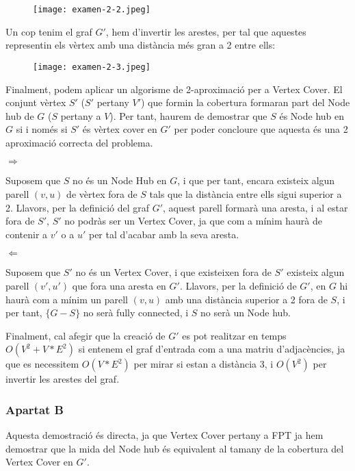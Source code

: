 \begin{figure}[H]
    \centering
    \texttt{[image: examen-2-2.jpeg]}
    \label{fig:ex2-2}
\end{figure}

Un cop tenim el graf $G'$, hem d'invertir les arestes, per tal que aquestes representin els vèrtex amb una distància més gran a 2 entre ells:

\begin{figure}[H]
    \centering
    \texttt{[image: examen-2-3.jpeg]}
    \label{fig:ex2-3}
\end{figure}

Finalment, podem aplicar un algorisme de 2-aproximació per a Vertex Cover. El conjunt vèrtex $S'$ ($S'$ pertany $V'$) que formin la cobertura formaran part del Node hub de $G$ ($S$ pertany a $V$). Per tant, haurem de demostrar que $S$ és Node hub en $G$ si i només si $S'$ és vèrtex cover en $G'$ per poder concloure que aquesta és una 2 aproximació correcta del problema.


$\Rightarrow$


Suposem que $S$ no és un Node Hub en $G$, i que per tant, encara existeix algun parell $(v,u)$ de vèrtex fora de $S$ tals que la distància entre ells sigui superior a 2. Llavors, per la definició del graf $G'$, aquest parell formarà una aresta, i al estar fora de $S'$, $S'$ no podràs ser un Vertex Cover, ja que com a mínim haurà de contenir a $v'$ o a $u'$ per tal d'acabar amb la seva aresta.


$\Leftarrow$


Suposem que $S'$ no és un Vertex Cover, i que existeixen fora de $S'$ existeix algun parell $(v',u')$ que fora una aresta en $G'$. Llavors, per la definició de $G'$, en $G$ hi haurà com a mínim un parell $(v,u)$ amb una distància superior a 2 fora de $S$, i per tant, $\{G-S\}$ no serà fully connected, i $S$ no serà un Node hub.
\newline


Finalment, cal afegir que la creació de $G'$ es pot realitzar en temps $O(V^2 + V*E^2)$ si entenem el graf d'entrada com a una matriu d'adjacències, ja que es necessitem $O(V*E^2)$ per mirar si estan a distància 3, i $O(V^2)$ per invertir les arestes del graf.
\subsubsection{Apartat B}
Aquesta demostració és directa, ja que Vertex Cover pertany a FPT ja hem demostrar que la mida del Node hub és equivalent al tamany de la cobertura del Vertex Cover en $G'$.